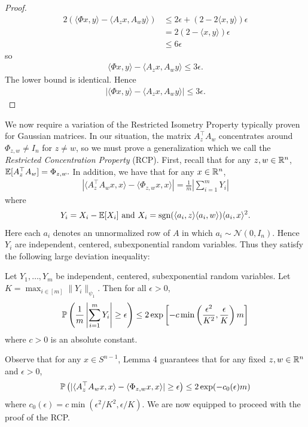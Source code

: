 \documentclass{article}
\begin{document}
\begin{proof}
\begin{align*}
2 \left(\langle \Phi x,y \rangle - \langle A_z x, A_w y \rangle\right) & \leq 2 \epsilon + (2 - 2\langle x,y\rangle)\epsilon \\
& = 2(2 - \langle x,y \rangle)\epsilon \\
& \leq 6 \epsilon
\end{align*} so \begin{align*}
\langle \Phi x,y \rangle - \langle A_z x, A_w y \rangle \leq 3 \epsilon.
\end{align*} The lower bound is identical. Hence \begin{align*}
\left|\langle \Phi x,y \rangle - \langle A_z x, A_w y \rangle \right| \leq 3 \epsilon.
\end{align*}
\end{proof}

We now require a variation of the Restricted Isometry Property typically proven for Gaussian matrices. In our situation, the matrix $A_z^\top A_w$ concentrates around $\Phi_{z,w} \neq I_{n}$ for $z \neq w$, so we must prove a generalization which we call the \textit{Restricted Concentration Property} (RCP). First, recall that for any $z,w \in \mathbb{R}^n$, $\operatorname{\mathbb{E}}[A_z^\top A_w] = \Phi_{z,w}.$ In addition, we have that for any $x \in \mathbb{R}^n$, \begin{align*}
\left|\langle A_z^\top A_w x,x \rangle - \langle \Phi_{z,w}x,x \rangle\right| = \frac{1}{m} \left|\sum_{i=1}^m Y_i \right|
\end{align*} where \begin{align*}
Y_i = X_i - \operatorname{\mathbb{E}}[X_i]\ \text{and}\ X_i = \operatorname{sgn}(\langle a_i,z \rangle \langle a_i, w\rangle) \langle a_i , x\rangle^2.
\end{align*} Here each $a_i$ denotes an unnormalized row of $A$ in which $a_i \sim \mathcal{N}(0,I_n)$. Hence $Y_i$ are independent, centered, subexponential random variables. Thus they satisfy the following large deviation inequality: \begin{lem}
Let $Y_1,\dots,Y_m$ be independent, centered, subexponential random variables. Let $K = \max_{i \in[m]} \|Y_i\|_{\psi_1}$. Then for all $\epsilon > 0$, \begin{align*}
\operatorname{\mathbb{P}}\left(\frac{1}{m} \left|\sum_{i=1}^m Y_i \right| \geq \epsilon \right) \leq 2 \exp\left[-c \min\left(\frac{\epsilon^2}{K^2}, \frac{\epsilon}{K}\right)m\right]
\end{align*} where $c > 0$ is an absolute constant.
\end{lem} Observe that for any $x \in S^{n-1}$, Lemma 4 guarantees that for any fixed $z,w \in \mathbb{R}^n$ and $\epsilon > 0$, \begin{align}
\operatorname{\mathbb{P}}\left(|\langle A_z^\top A_w x,x \rangle - \langle \Phi_{z,w} x,x \rangle| \geq \epsilon\right) \leq 2\exp(-c_0(\epsilon) m) \label{conc_bound}
\end{align} where $c_0(\epsilon) = c \min(\epsilon^2/K^2,\epsilon/K).$ We are now equipped to proceed with the proof of the RCP.
\end{document}

